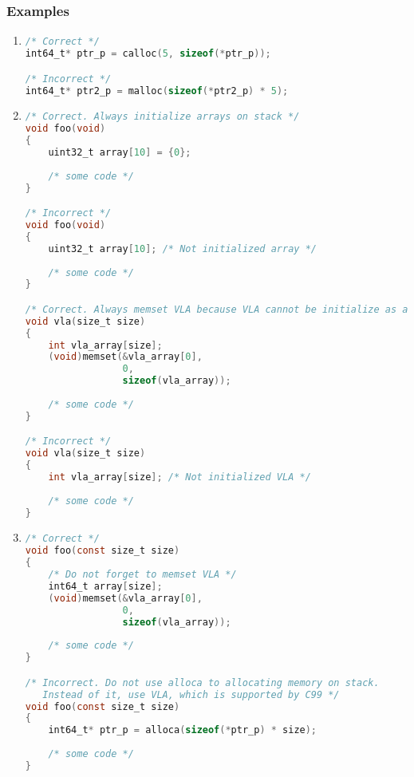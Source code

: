 \subsubsection{Examples}
\begin{enumerate}
    \item 
\begin{lstlisting}[language=C,style=C99]
/* Correct */
int64_t* ptr_p = calloc(5, sizeof(*ptr_p));

/* Incorrect */
int64_t* ptr2_p = malloc(sizeof(*ptr2_p) * 5);
\end{lstlisting} 

    \item 
\begin{lstlisting}[language=C,style=C99]
/* Correct. Always initialize arrays on stack */ 
void foo(void)
{
    uint32_t array[10] = {0};
    
    /* some code */
}

/* Incorrect */ 
void foo(void)
{
    uint32_t array[10]; /* Not initialized array */
    
    /* some code */
}

/* Correct. Always memset VLA because VLA cannot be initialize as arrays of constant known size */
void vla(size_t size)
{
    int vla_array[size];
    (void)memset(&vla_array[0],
                 0,
                 sizeof(vla_array));
    
    /* some code */
}

/* Incorrect */
void vla(size_t size)
{
    int vla_array[size]; /* Not initialized VLA */
    
    /* some code */
}
\end{lstlisting}

    \item 
\begin{lstlisting}[language=C,style=C99]
/* Correct */
void foo(const size_t size)
{
    /* Do not forget to memset VLA */
    int64_t array[size];
    (void)memset(&vla_array[0],
                 0,
                 sizeof(vla_array));
    
    /* some code */
}

/* Incorrect. Do not use alloca to allocating memory on stack. 
   Instead of it, use VLA, which is supported by C99 */
void foo(const size_t size)
{
    int64_t* ptr_p = alloca(sizeof(*ptr_p) * size);
    
    /* some code */
}
\end{lstlisting}
\end{enumerate}

